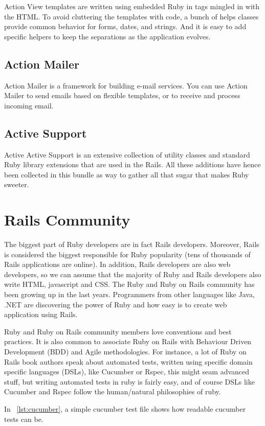 Action View templates are written using embedded Ruby in tags mingled in with the HTML. 
To avoid cluttering the templates with code, a bunch of helps classes provide common behavior for forms, dates, and strings. 
And it is easy to add specific helpers to keep the separations as the application evolves.


\subsection{Action Mailer}  
Action Mailer is a framework for building e-mail services. You can use Action Mailer to send emails based on flexible templates, or to receive and process incoming email.


\subsection{Active Support} Active 
Active Support is an extensive collection of utility classes and standard Ruby library extensions that are used in the Rails. All these additions have hence been collected in this bundle as way to gather all that sugar that makes Ruby sweeter.


\section{Rails Community} 
The biggest part of Ruby developers are in fact Rails developers. 
Moreover, Rails is considered the biggest responsible for Ruby popularity
(tens of thousands of Rails applications are online).
In addition, Rails developers are also web developers, 
so we can assume that the majority of Ruby and Rails developers also write HTML, javascript and CSS.
The Ruby and Ruby on Rails community has been growing up in the last years. 
Programmers from other languages like Java, .NET are discovering the power of Ruby and how easy is 
to create web application using Rails.

Ruby and Ruby on Rails community members love conventions and best practices.
It is also common to associate Ruby on Rails with Behaviour Driven Development (BDD) and Agile methodologies.
For instance, a lot of Ruby on Rails book authors speak about automated tests, 
written using specific domain specific languages (DSLs), like Cucumber or Rspec, 
this might seam advanced stuff, but writing automated tests in ruby is fairly easy,
and of course DSLs like Cucumber and Rspec follow the human/natural philosophies of ruby.

In ~\ref{lst:cucumber}, a simple cucumber test file shows how readable cucumber tests can be.

